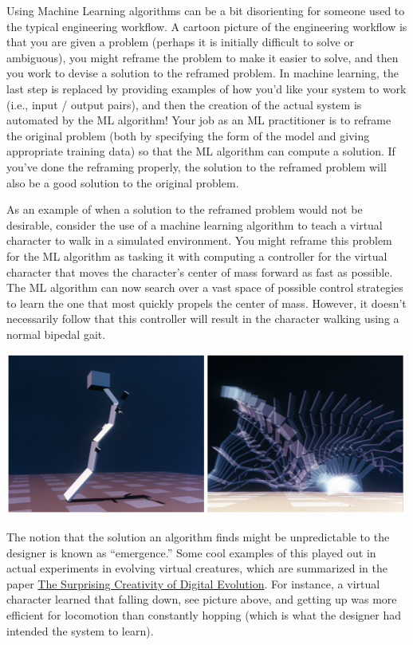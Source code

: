 \documentclass[assignment01_Solutions]{subfiles}
\begin{document}
Using Machine Learning algorithms can be a bit disorienting for someone used to the typical engineering workflow.  A cartoon picture of the engineering workflow is that you are given a problem (perhaps it is initially difficult to solve or ambiguous), you might reframe the problem to make it easier to solve, and then you work to devise a solution to the reframed problem.  In machine learning, the last step is replaced by providing examples of how you'd like your system to work (i.e., input / output pairs), and then the creation of the actual system is automated by the ML algorithm!  Your job as an ML practitioner is to reframe the original problem (both by specifying the form of the model and giving appropriate training data) so that the ML algorithm can compute a solution.  If you've done the reframing properly, the solution to the reframed problem will also be a good solution to the original problem.

As an example of when a solution to the reframed problem would not be desirable, consider the use of a machine learning algorithm to teach a virtual character to walk in a simulated environment.  You might reframe this problem for the ML algorithm as tasking it with computing a controller for the virtual character that moves the character's center of mass forward as fast as possible.  The ML algorithm can now search over a vast space of possible control strategies to learn the one that most quickly propels the center of mass.  However, it doesn't necessarily follow that this controller will result in the character walking using a normal bipedal gait.

\begin{center}
\includegraphics[width=.6\linewidth]{figures/fallingbot}
\end{center}

The notion that the solution an algorithm finds might be unpredictable to the designer is known as ``emergence.''  Some cool examples of this played out in actual experiments in evolving virtual creatures, which are summarized in the paper \href{https://arxiv.org/pdf/1803.03453.pdf}{The Surprising Creativity of Digital Evolution}.  For instance, a virtual character learned that falling down, see picture above, and getting up was more efficient for locomotion than constantly hopping (which is what the designer had intended the system to learn).
\end{document}
